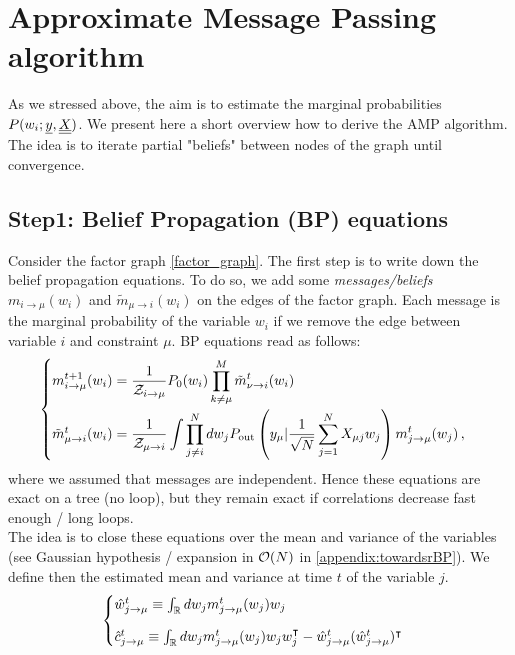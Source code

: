 \documentclass[aip,jmp,amsmath,amssymb,reprint]{revtex4}
\begin{document}
\newpage
\section{\Large Approximate Message Passing algorithm}

As we stressed above, the aim is to estimate the marginal probabilities $P(w_i;{\underline{y}},\underline{\underline{X}})$. We present here a short overview how to derive the AMP algorithm. The idea is to iterate partial "beliefs" between nodes of the graph until convergence.

\label{AMP}
\subsection{Step1: Belief Propagation (BP) equations}
Consider the factor graph \ref{factor_graph}.  
The first step is to write down the belief propagation equations. To do so, we add some \textit{messages/beliefs} $m_{i\to \mu} (w_i)$ and $\tilde{m}_{\mu \to i} (w_i) $ on the edges of the factor graph. Each message is the marginal probability of the variable $w_i$ if we remove the edge between variable $i$ and constraint $\mu$. BP equations read as follows: \\

\begin{equation}
	\begin{cases}
		m_{i\to \mu}^{t+1} (w_i) = \displaystyle \frac{1}{\mathcal{Z}_{i\to \mu}} P_0 (w_i) \prod\limits_{k \neq \mu}^M \tilde{m}_{\nu \to i}^t (w_i) \vspace{0.1cm}\\
		\tilde{m}_{\mu \to i}^t (w_i) =  \displaystyle \frac{1}{\mathcal{Z}_{\mu \to i}} \int \prod\limits_{j\neq i}^N dw_j P_{\rm out}\left (y_{\mu} | \displaystyle  \frac{1}{\sqrt{N}} \sum_{j=1}^N  X_{\mu j}w_{j} \right)  m_{j \to \mu}^t (w_j )\,,
	\end{cases}
	\label{supp:BPEquations}
\end{equation}
where we assumed that messages are independent. Hence these equations are exact on a tree (no loop), but they remain exact if correlations decrease fast enough / long loops.\\

The idea is to close these equations over the mean and variance of the variables (see Gaussian hypothesis / expansion in $\mathcal{O}(N)$ in \ref{appendix:towardsrBP}). We define then the estimated mean and variance at time $t$ of the variable $j$.
\begin{equation*}
	\begin{cases}
		\hat{w}_{j\to \mu}^t \equiv \int_{\bbR} dw_j
		 m_{j\to \mu}^t (w_j ) w_j  \spacecase
		 \hat{c}_{j\to \mu}^t \equiv  \int_{\bbR} dw_j
		 m_{j\to \mu}^t (w_j ) w_j w_j^\intercal - \hat{w}_{j\to \mu}^t(\hat{w}_{j\to \mu}^t)^\intercal
	\end{cases}
\label{What_Chat}
\end{equation*}
\end{document}
